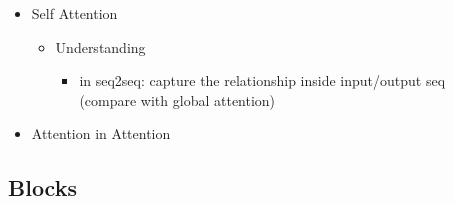 \begin{itemize}
\item Self Attention
	\begin{itemize}
	\item Understanding
		\begin{itemize}
		\item in seq2seq: capture the relationship inside input/output seq \\ 
		(compare with global attention)
		\end{itemize}
	\end{itemize}
\item Attention in Attention
\end{itemize}

\subsection{Blocks}
